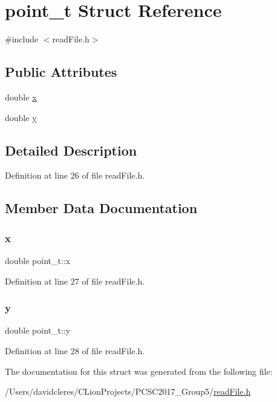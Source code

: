\hypertarget{structpoint__t}{}\section{point\+\_\+t Struct Reference}
\label{structpoint__t}


{\ttfamily \#include $<$read\+File.\+h$>$}

\subsection*{Public Attributes}
\begin{DoxyCompactItemize}
\item 
double \mbox{\hyperlink{structpoint__t_acf7556ca44360564040f5c86257b55b1}{x}}
\item 
double \mbox{\hyperlink{structpoint__t_a8590af4986d0e4ef2b6756946f80438c}{y}}
\end{DoxyCompactItemize}


\subsection{Detailed Description}


Definition at line 26 of file read\+File.\+h.



\subsection{Member Data Documentation}
\mbox{\label{structpoint__t_acf7556ca44360564040f5c86257b55b1}} 
\subsubsection{\texorpdfstring{x}{x}}
{\footnotesize\ttfamily double point\+\_\+t\+::x}



Definition at line 27 of file read\+File.\+h.

\mbox{\label{structpoint__t_a8590af4986d0e4ef2b6756946f80438c}} 
\subsubsection{\texorpdfstring{y}{y}}
{\footnotesize\ttfamily double point\+\_\+t\+::y}



Definition at line 28 of file read\+File.\+h.



The documentation for this struct was generated from the following file\+:\begin{DoxyCompactItemize}
\item 
/\+Users/davidcleres/\+C\+Lion\+Projects/\+P\+C\+S\+C2017\+\_\+\+Group5/\mbox{\hyperlink{read_file_8h}{read\+File.\+h}}\end{DoxyCompactItemize}

